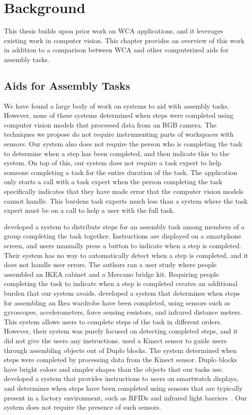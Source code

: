 \chapter{Background}\label{chap:background}

This thesis builds upon prior work on WCA applications, and it leverages
existing work in computer vision.
This chapter provides an overview of this work in addition to a comparison
between WCA and other computerized aids for assembly tasks.

\section{Aids for Assembly Tasks}

We have found a large body of work on systems to aid with assembly tasks.
However, none of these systems determined when steps were completed using
computer vision models that processed data from an RGB camera. The techniques we
propose do not require instrumenting parts of workspaces with sensors. Our
system also does not require the person who is completing the task to determine
when a step has been completed, and then indicate this to the system. On top of
this, our system does not require a task expert to help someone completing a
task for the entire duration of the task.
The application only starts a call with a task expert when the person
completing the task specifically indicates that they have made error that the
computer vision models cannot handle.
This burdens task experts much less than a system where the task expert must be
on a call to help a user with the full task.

\citet{webuild} developed a system to distribute steps for an assembly task
among members of a group completing the task together. Instructions are
displayed on a smartphone screen, and users manually press a
button to indicate when a step is completed.
Their system has no way to automatically detect when a step is completed, and
it does not handle user errors.
The authors ran a user study where people assembled an IKEA cabinet and a
Meccano bridge kit.
Requiring people completing the task to indicate when a step is completed
creates an additional burden that our system avoids.
\citet{sensors} developed a system that
determines when steps for assembling an Ikea wardrobe have been completed, using
sensors such as gyroscopes, accelerometers, force sensing resistors, and
infrared distance meters. This system allows users to complete steps of the task
in different orders.
However, their system was purely focused on detecting completed steps, and it
did not give the users any instructions.
\citet{kinect} used a Kinect
sensor to guide users through assembling objects out of Duplo blocks. The system
determined when steps were completed by processing data from the Kinect sensor.
Duplo blocks have bright colors and simpler shapes than the objects that our
tasks use.
\citet{smartwatch} developed a system that provides instructions to users on
smartwatch displays, and determines when steps have been completed using sensors
that are typically present in a factory environment, such as RFIDs and infrared
light barriers~\cite{smartwatch2}.
Our system does not require the presence of such sensors.

